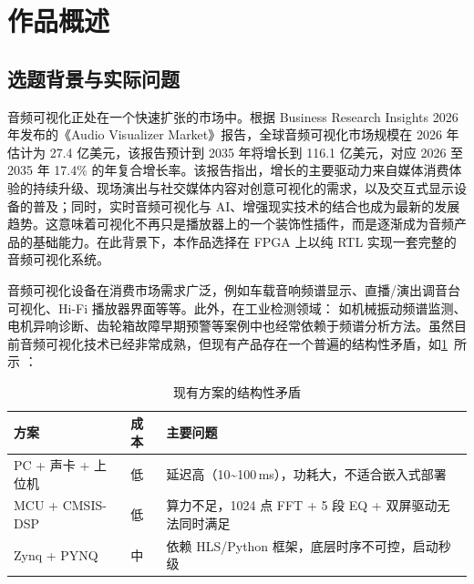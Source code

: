 \documentclass[withoutpreface,bwprint]{cumcmthesis}
\begin{document}
\tableofcontents
\newpage

\section{作品概述}

\subsection{选题背景与实际问题}

音频可视化正处在一个快速扩张的市场中。根据 Business Research Insights 2026 年发布的《Audio Visualizer Market》报告，全球音频可视化市场规模在 2026 年估计为 27.4 亿美元，该报告预计到 2035 年将增长到 116.1 亿美元，对应 2026 至 2035 年 17.4\% 的年复合增长率\cite{bri2026avm}。该报告指出，增长的主要驱动力来自媒体消费体验的持续升级、现场演出与社交媒体内容对创意可视化的需求，以及交互式显示设备的普及；同时，实时音频可视化与 AI、增强现实技术的结合也成为最新的发展趋势。这意味着可视化不再只是播放器上的一个装饰性插件，而是逐渐成为音频产品的基础能力。在此背景下，本作品选择在 FPGA 上以纯 RTL 实现一套完整的音频可视化系统。

音频可视化设备在消费市场需求广泛，例如车载音响频谱显示、直播/演出调音台可视化、Hi-Fi 播放器界面等等。此外，在工业检测领域：
如机械振动频谱监测、电机异响诊断、齿轮箱故障早期预警等案例中也经常依赖于频谱分析方法。虽然目前音频可视化技术已经非常成熟，但现有产品存在一个普遍的结构性矛盾，如\cref{tab:bg}~所示 ：

\begin{table}[H]
\centering
\caption{现有方案的结构性矛盾}
\label{tab:bg}
\begin{tabular}{p{3.4cm}p{1.4cm}p{8.0cm}}
\toprule[1.5pt]
\rowcolor{gray!25} 方案 & 成本 & 主要问题 \\
\midrule[1pt]
PC + 声卡 + 上位机 & 低 & 延迟高（10\textasciitilde 100\,ms），功耗大，不适合嵌入式部署 \\
MCU + CMSIS-DSP   & 低 & 算力不足，1024 点 FFT + 5 段 EQ + 双屏驱动无法同时满足 \\
Zynq + PYNQ       & 中 & 依赖 HLS/Python 框架，底层时序不可控，启动秒级 \\
\bottomrule[1.5pt]
\end{tabular}
\end{table}
\end{document}
